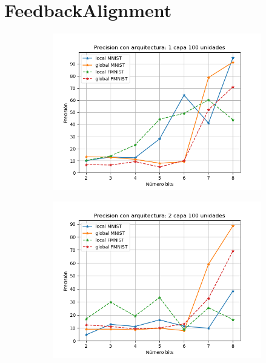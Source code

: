 \section{FeedbackAlignment}
\begin{figure}[H]
    \centering
    \begin{subfigure}[H]{0.45\textwidth}
    \includegraphics[width=\textwidth]{imagenes/fa/Precision con arquitectura: 1 capa 100 unidades.png}
    \end{subfigure}
    \begin{subfigure}[H]{0.45\textwidth}
    \includegraphics[width=\textwidth]{imagenes/fa/Precision con arquitectura: 2 capa 100 unidades.png}
    \end{subfigure}

\end{figure}
